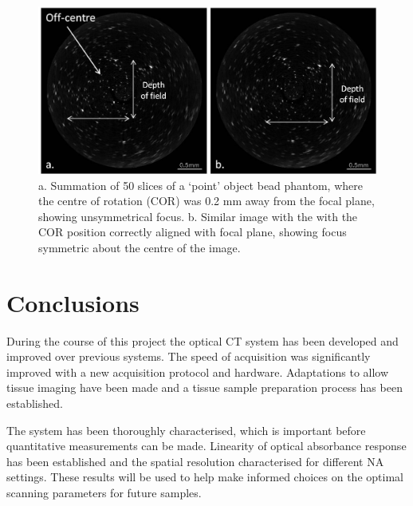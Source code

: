 \begin{figure}
\centering
\includegraphics[width=\linewidth]{meth_img/focusing_beads.jpg}
\caption{a. Summation of 50 slices of a `point' object bead phantom, where the centre of rotation (COR) was 0.2 mm away from the focal plane, showing unsymmetrical focus. b. Similar image with the with the COR position correctly aligned with focal plane, showing focus symmetric about the centre of the image.}
\label{fig:bead_DOF}
\end{figure}



\section{Conclusions}

During the course of this project the optical CT system has been developed and improved over previous systems. The speed of acquisition was significantly improved with  a new acquisition protocol and hardware. Adaptations to allow tissue imaging have been made and a tissue sample preparation process has been established. 

The system has been thoroughly characterised, which is important before quantitative measurements can be made. Linearity of optical absorbance response has been established and the spatial resolution characterised for different NA settings. These results will be used to help make informed choices on the optimal scanning parameters for future samples. 

















